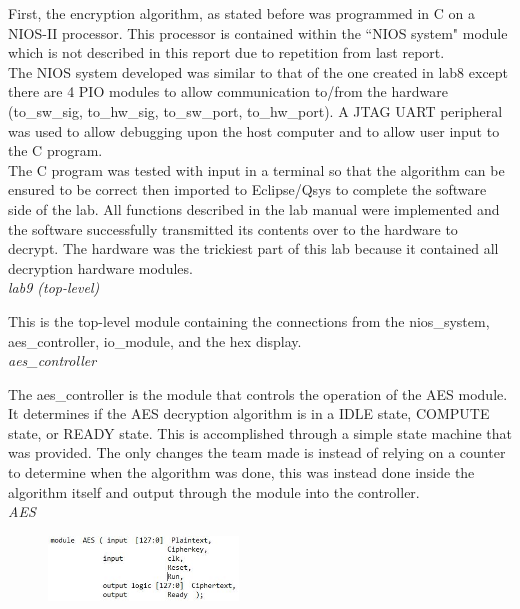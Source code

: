 \documentclass[journal, twocolumn, final,11pt,letterpaper]{IEEEtran}
\begin{document}
First, the encryption algorithm, as stated before was programmed in C on a NIOS-II processor. This processor is contained within the ``NIOS system" module which is not described in this report due to repetition from last report. \\

The NIOS system developed was similar to that of the one created in lab8 except there are 4 PIO modules to allow communication to/from the hardware (to\_sw\_sig, to\_hw\_sig, to\_sw\_port, to\_hw\_port). A JTAG UART peripheral was used to allow debugging upon the host computer and to allow user input to the C program. \\

The C program was tested with input in a terminal so that the algorithm can be ensured to be correct then imported to Eclipse/Qsys to complete the software side of the lab. All functions described in the lab manual were implemented and the software successfully transmitted its contents over to the hardware to decrypt. The hardware was the trickiest part of this lab because it contained all decryption hardware modules.\\

\textit{lab9 (top-level)}\\
\vspace{-4mm}

This is the top-level module containing the connections from the nios\_system, aes\_controller, io\_module, and the hex display. \\

\textit{aes\_controller}\\
\vspace{-4mm}

The aes\_controller is the module that controls the operation of the AES module. It determines if the AES decryption algorithm is in a IDLE state, COMPUTE state, or READY state. This is accomplished through a simple state machine that was provided. The only changes the team made is instead of relying on a counter to determine when the algorithm was done, this was instead done inside the algorithm itself and output through the module into the controller.\\

\textit{AES}\\
\vspace{-4mm}

\begin{figure}[h]
	\centering
	\includegraphics[width=0.45\textwidth]{AES.jpg}
	\label{fig:AES}
\end{figure}
\end{document}
